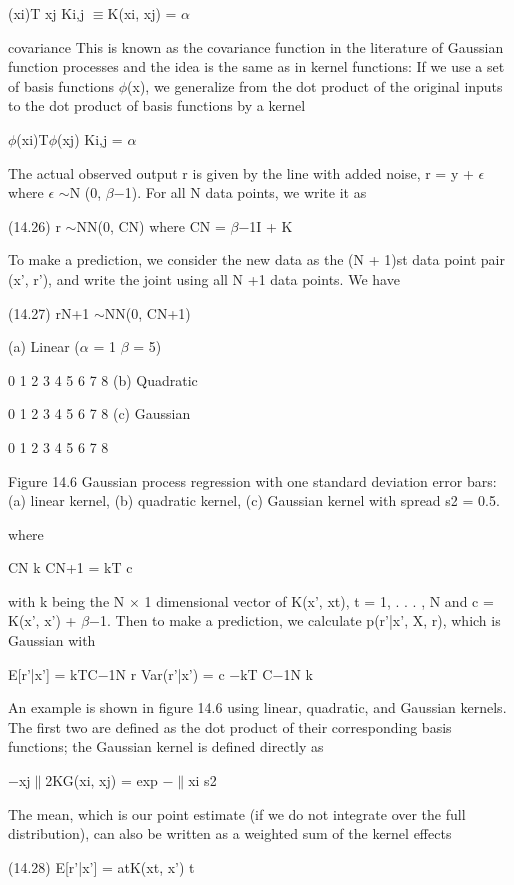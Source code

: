 (xi)T xj Ki,j $\equiv$K(xi, xj) = $\alpha$

covariance This is known as the covariance function in the literature of Gaussian function processes and the idea is the same as in kernel functions: If we use a set of basis functions $\phi$(x), we generalize from the dot product of the original inputs to the dot product of basis functions by a kernel

$\phi$(xi)T$\phi$(xj) Ki,j = $\alpha$

The actual observed output r is given by the line with added noise, r = y + $\epsilon$ where $\epsilon$ $\sim$N (0, $\beta$$-$1). For all N data points, we write it as

(14.26) r $\sim$NN(0, CN) where CN = $\beta$$-$1I + K

To make a prediction, we consider the new data as the (N + 1)st data point pair (x', r'), and write the joint using all N +1 data points. We have

(14.27) rN+1 $\sim$NN(0, CN+1)

(a) Linear ($\alpha$ = 1 $\beta$ = 5)

0 1 2 3 4 5 6 7 8 (b) Quadratic

0 1 2 3 4 5 6 7 8 (c) Gaussian

0 1 2 3 4 5 6 7 8

Figure 14.6 Gaussian process regression with one standard deviation error bars: (a) linear kernel, (b) quadratic kernel, (c) Gaussian kernel with spread s2 = 0.5.

where

CN k CN+1 = kT c

with k being the N $\times$ 1 dimensional vector of K(x', xt), t = 1, . . . , N and c = K(x', x') + $\beta$$-$1. Then to make a prediction, we calculate p(r'|x', X, r), which is Gaussian with

E[r'|x'] = kTC$-$1N r Var(r'|x') = c $-$kT C$-$1N k

An example is shown in figure 14.6 using linear, quadratic, and Gaussian kernels. The first two are defined as the dot product of their corresponding basis functions; the Gaussian kernel is defined directly as

$-$xj$\parallel$2KG(xi, xj) = exp $-$$\parallel$xi s2

The mean, which is our point estimate (if we do not integrate over the full distribution), can also be written as a weighted sum of the kernel effects

(14.28) E[r'|x'] = atK(xt, x') t

